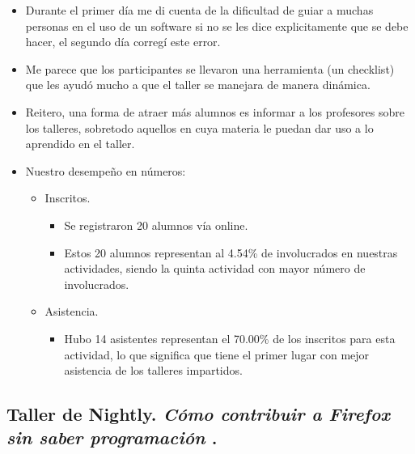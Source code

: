 \documentclass[a4paper,11pt]{article}                 %
\begin{document}
  
    \begin{itemize}
    \item Durante el primer día me di cuenta de la dificultad de guiar a muchas personas en el uso de un software si no se les dice explicitamente que se debe hacer, el segundo día corregí este error.
    \item Me parece que los participantes se llevaron una herramienta (un checklist) que les ayudó mucho a que el taller se manejara de manera dinámica.
    \item Reitero, una forma de atraer más alumnos es informar a los profesores sobre los talleres, sobretodo aquellos en cuya materia le puedan dar uso a lo aprendido en el taller.
    
    \item Nuestro desempeño en números:
    
    \begin{itemize}
 
    
    \item Inscritos.
    \begin{itemize}
      \item Se registraron 20 alumnos vía online.
      \item Estos 20 alumnos representan al 4.54\% de involucrados en nuestras actividades, siendo la quinta actividad con mayor número de involucrados. 
    \end{itemize}
    
    \item Asistencia.
    \begin{itemize}
      \item Hubo 14 asistentes representan el 70.00\% de los inscritos para esta actividad, lo que significa que tiene el primer lugar con mejor asistencia de los talleres impartidos. 
    \end{itemize}
    \end{itemize} 
    
  \end{itemize}     
  \subsection{Taller de Nightly. \textit{Cómo contribuir a Firefox sin saber programación }.}  
  
\end{document}
